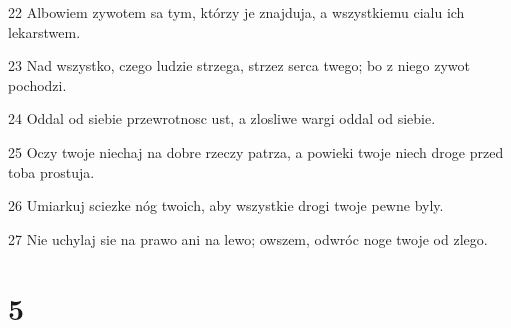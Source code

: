 \par 22 Albowiem zywotem sa tym, którzy je znajduja, a wszystkiemu cialu ich lekarstwem.
\par 23 Nad wszystko, czego ludzie strzega, strzez serca twego; bo z niego zywot pochodzi.
\par 24 Oddal od siebie przewrotnosc ust, a zlosliwe wargi oddal od siebie.
\par 25 Oczy twoje niechaj na dobre rzeczy patrza, a powieki twoje niech droge przed toba prostuja.
\par 26 Umiarkuj sciezke nóg twoich, aby wszystkie drogi twoje pewne byly.
\par 27 Nie uchylaj sie na prawo ani na lewo; owszem, odwróc noge twoje od zlego.

\chapter{5}

